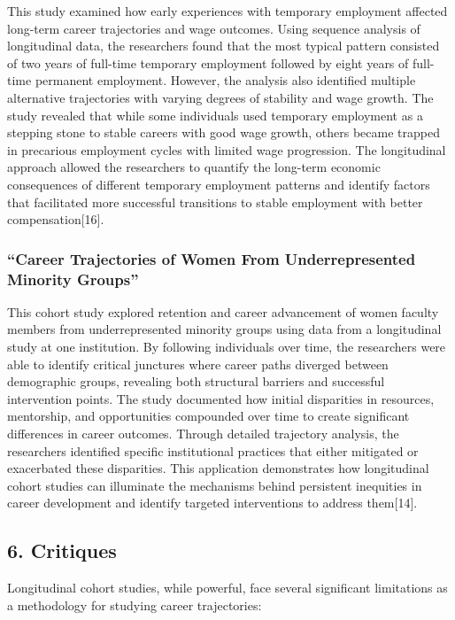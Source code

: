 \documentclass[
  letterpaper,
  DIV=11,
  numbers=noendperiod]{scrartcl}
\begin{document}
This study examined how early experiences with temporary employment
affected long-term career trajectories and wage outcomes. Using sequence
analysis of longitudinal data, the researchers found that the most
typical pattern consisted of two years of full-time temporary employment
followed by eight years of full-time permanent employment. However, the
analysis also identified multiple alternative trajectories with varying
degrees of stability and wage growth. The study revealed that while some
individuals used temporary employment as a stepping stone to stable
careers with good wage growth, others became trapped in precarious
employment cycles with limited wage progression. The longitudinal
approach allowed the researchers to quantify the long-term economic
consequences of different temporary employment patterns and identify
factors that facilitated more successful transitions to stable
employment with better compensation{[}16{]}.

\subsubsection{``Career Trajectories of Women From Underrepresented
Minority
Groups''}\label{career-trajectories-of-women-from-underrepresented-minority-groups}

This cohort study explored retention and career advancement of women
faculty members from underrepresented minority groups using data from a
longitudinal study at one institution. By following individuals over
time, the researchers were able to identify critical junctures where
career paths diverged between demographic groups, revealing both
structural barriers and successful intervention points. The study
documented how initial disparities in resources, mentorship, and
opportunities compounded over time to create significant differences in
career outcomes. Through detailed trajectory analysis, the researchers
identified specific institutional practices that either mitigated or
exacerbated these disparities. This application demonstrates how
longitudinal cohort studies can illuminate the mechanisms behind
persistent inequities in career development and identify targeted
interventions to address them{[}14{]}.

\subsection{6. Critiques}\label{critiques}

Longitudinal cohort studies, while powerful, face several significant
limitations as a methodology for studying career trajectories:
\end{document}
